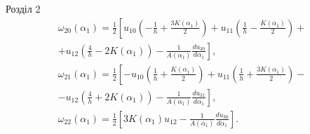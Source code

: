 \documentclass[8pt]{beamer}
\numberwithin{figure}{section}
\numberwithin{equation}{section}
\numberwithin{table}{section}
\begin{document}
\begin{frame}{Розділ 2}
\begin{equation}\label{eq:sqt_strain_ang}
\begin{aligned}
\omega_{20}\left(\alpha_1\right)=\frac12 
\left[
u_{10}
\left( -\frac{1}{h}+\frac{3K\left( \alpha_1 \right)}{2} \right)
+u_{11}\left( \frac{1}{h}-\frac{K\left( \alpha_1 \right)}{2} \right)+\right.\\
\left.
+u_{12}\left( \frac{4}{h}-2K\left( \alpha_1 \right) \right)
 - \frac{1}{A\left(\alpha_1\right)}\frac{du_{30}}{d\alpha_1}
\right],\\
\omega_{21}\left(\alpha_1\right)=\frac12 
\left[
-u_{10}
\left( \frac{1}{h}+\frac{K\left( \alpha_1 \right)}{2} \right)
+u_{11}\left( \frac{1}{h}+\frac{3K\left( \alpha_1 \right)}{2} \right)-\right.\\
\left.
-u_{12}\left( \frac{4}{h}+2K\left( \alpha_1 \right) \right)
 - \frac{1}{A\left(\alpha_1\right)}\frac{du_{31}}{d\alpha_1}
\right],\\
\omega_{22}\left(\alpha_1\right)=\frac12 
\left[3K\left( \alpha_1 \right)u_{12}
 - \frac{1}{A\left(\alpha_1\right)}\frac{du_{30}}{d\alpha_1}
\right].
\end{aligned}
\end{equation}

\end{frame}
\end{document}
